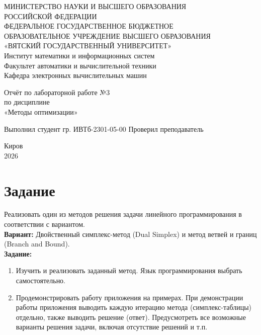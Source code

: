 \documentclass[oneside,a4paper,14pt]{extarticle}
\begin{document}
\newpage\thispagestyle{empty}
\begin{center}
	МИНИСТЕРСТВО НАУКИ И ВЫСШЕГО ОБРАЗОВАНИЯ\\
	РОССИЙСКОЙ ФЕДЕРАЦИИ\\
	ФЕДЕРАЛЬНОЕ ГОСУДАРСТВЕННОЕ БЮДЖЕТНОЕ\\
	ОБРАЗОВАТЕЛЬНОЕ УЧРЕЖДЕНИЕ ВЫСШЕГО ОБРАЗОВАНИЯ\\
	«ВЯТСКИЙ ГОСУДАРСТВЕННЫЙ УНИВЕРСИТЕТ»\\
	Институт математики и информационных систем\\
	Факультет автоматики и вычислительной техники\\
	Кафедра электронных вычислительных машин
\end{center}
\vspace{20mm}
\begin{center}
	Отчёт по лабораторной работе №3\\
	по дисциплине\\
	«Методы оптимизации»\\
\end{center}
\vfill
Выполнил студент гр. ИВТб-2301-05-00 \hfill
{}
Проверил преподаватель\hfill
{}
\vfill
\begin{center}
	Киров\\
	2026
\end{center}
\newpage
\setcounter{page}{1}
\tableofcontents
\newpage

\section*{Задание}
Реализовать один из методов решения задачи линейного программирования в соответствии с вариантом.\\

\textbf{Вариант:} Двойственный симплекс-метод (Dual Simplex) и метод ветвей и границ (Branch and Bound).\\

\textbf{Задание:}
\begin{enumerate}
	\item Изучить и реализовать заданный метод. Язык программирования выбрать самостоятельно.
	\item Продемонстрировать работу приложения на примерах. При демонстрации работы приложения выводить каждую итерацию метода (симплекс-таблицы) отдельно, также выводить решение (ответ). Предусмотреть все возможные варианты решения задачи, включая отсутствие решений и т.п.
\end{enumerate}
\end{document}
